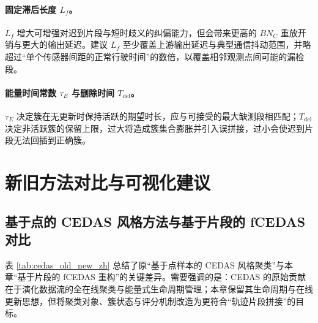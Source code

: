 \documentclass{xdupgthesis}
\begin{document}
\paragraph{固定滞后长度 $L_f$。}
$L_f$ 增大可增强对迟到片段与短时歧义的纠偏能力，但会带来更高的 $BN_C$ 重放开销与更大的输出延迟。建议 $L_f$ 至少覆盖上游输出延迟与典型通信抖动范围，并略超过“单个传感器间距的正常行驶时间”的数倍，以覆盖相邻观测点间可能的漏检段。

\paragraph{能量时间常数 $\tau_E$ 与删除时间 $T_{\mathrm{del}}$。}
$\tau_E$ 决定簇在无更新时保持活跃的期望时长，应与可接受的最大缺测段相匹配；$T_{\mathrm{del}}$ 决定非活跃簇的保留上限，过大将造成簇集合膨胀并引入误拼接，过小会使迟到片段无法回插到正确簇。

\section{新旧方法对比与可视化建议}
\subsection{基于点的 CEDAS 风格方法与基于片段的 fCEDAS 对比}
表 \ref{tab:cedas_old_new_zh} 总结了原“基于点样本的 CEDAS 风格聚类”与本章“基于片段的 fCEDAS 重构”的关键差异。需要强调的是：CEDAS 的原始贡献在于演化数据流的全在线聚类与能量式生命周期管理；本章保留其生命周期与在线更新思想，但将聚类对象、簇状态与评分机制改造为更符合“轨迹片段拼接”的目标。%
\end{document}
